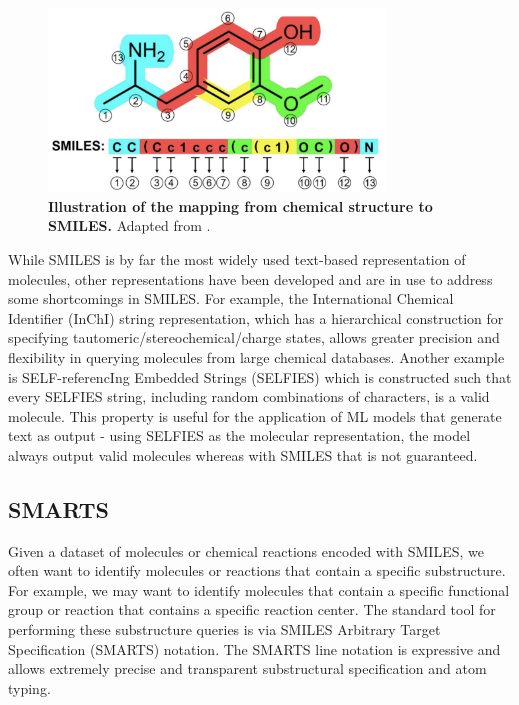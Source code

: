\begin{figure}[!h]
    \centering
    \includegraphics[width=0.8\textwidth]{Chapters/Background/Figs/smiles.png}
    \caption{\label{fig:smiles} \textbf{Illustration of the mapping from chemical structure to SMILES.} Adapted from \cite{Kim2021GenerativeCT}.}
\end{figure}

While SMILES is by far the most widely used text-based representation of molecules, other representations have been developed and are in use to address some shortcomings in SMILES. For example, the International Chemical Identifier (InChI) \cite{Heller2013InChI} string representation, which has a hierarchical construction for specifying tautomeric/stereochemical/charge states, allows greater precision and flexibility in querying molecules from large chemical databases. Another example is SELF-referencIng Embedded Strings (SELFIES) \cite{Krenn2020Selfies} which is constructed such that every SELFIES string, including random combinations of characters, is a valid molecule. This property is useful for the application of ML models that generate text as output - using SELFIES as the molecular representation, the model always output valid molecules whereas with SMILES that is not guaranteed.

\subsection{SMARTS} \label{subsec:smarts}
Given a dataset of molecules or chemical reactions encoded with SMILES, we often want to identify molecules or reactions that contain a specific substructure. For example, we may want to identify molecules that contain a specific functional group or reaction that contains a specific reaction center. The standard tool for performing these substructure queries is via SMILES Arbitrary Target Specification (SMARTS) notation. The SMARTS line notation is expressive and allows extremely precise and transparent substructural specification and atom typing.

